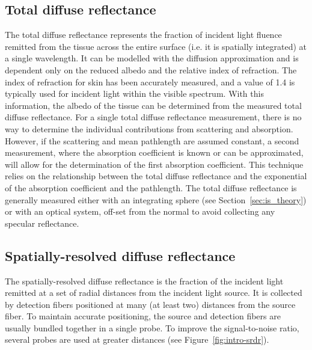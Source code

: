 \subsection{Total diffuse reflectance}
\label{sec:total_diff_refl}
The total diffuse reflectance represents the fraction of incident light fluence remitted from the tissue across the entire surface (i.e. it is spatially integrated) at a single wavelength. It can be modelled with the diffusion approximation and is dependent only on the reduced albedo and the relative index of refraction.\cite{Kim2011} The index of refraction for skin has been accurately measured, and a value of 1.4 is typically used for incident light within the visible spectrum.\cite{Kienle1996a} With this information, the albedo of the tissue can be determined from the measured total diffuse reflectance. For a single total diffuse reflectance measurement, there is no way to determine the individual contributions from scattering and absorption. However, if the scattering and mean pathlength are assumed constant, a second measurement, where the absorption coefficient is known or can be approximated, will allow for the determination of the first absorption coefficient. This technique relies on the relationship between the total diffuse reflectance and the exponential of the absorption coefficient and the pathlength. The total diffuse reflectance is generally measured either with an integrating sphere (see Section~\ref{sec:is_theory}) or with an optical system, off-set from the normal to avoid collecting any specular reflectance.

\subsection{Spatially-resolved diffuse reflectance}
\label{sec:spat_diff_refl}
The spatially-resolved diffuse reflectance is the fraction of the incident light remitted at a set of radial distances from the incident light source. It is collected by detection fibers positioned at many (at least two) distances from the source fiber.\cite{Kim2011} To maintain accurate positioning, the source and detection fibers are usually bundled together in a single probe. To improve the signal-to-noise ratio, several probes are used at greater distances (see Figure~\ref{fig:intro-srdr}).

